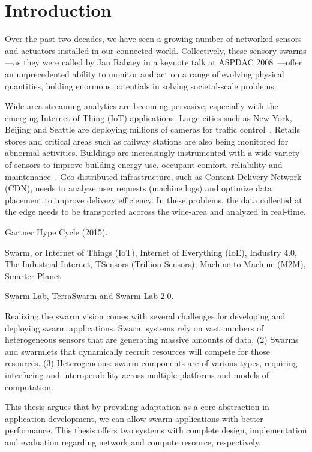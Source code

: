 \documentclass[thesis.tex]{subfiles}
\begin{document}
\chapter{Introduction}

Over the past two decades, we have seen a growing number of networked sensors
and actuators installed in our connected world. Collectively, these sensory
swarms---as they were called by Jan Rabaey in a keynote talk at ASPDAC
2008~\cite{rabaey2008brand}---offer an unprecedented ability to monitor and act
on a range of evolving physical quantities, holding enormous potentials in
solving societal-scale problems.

Wide-area streaming analytics are becoming pervasive, especially with the
emerging Internet-of-Thing (IoT) applications. Large cities such as New York,
Beijing and Seattle are deploying millions of cameras for traffic
control~\cite{london.surveillance,skynet}. Retails stores and critical areas
such as railway stations are also being monitored for abnormal
activities. Buildings are increasingly instrumented with a wide variety of
sensors to improve building energy use, occupant comfort, reliability and
maintenance~\cite{krioukov2012building}. Geo-distributed infrastructure, such as
Content Delivery Network (CDN), needs to analyze user requests (machine logs)
and optimize data placement to improve delivery efficiency. In these problems,
the data collected at the edge needs to be transported acoross the wide-area and
analyzed in real-time.

Gartner Hype Cycle (2015).

Swarm, or Internet of Things (IoT), Internet of Everything (IoE), Industry 4.0,
The Industrial Internet, TSensors (Trillion Sensors), Machine to Machine (M2M),
Smarter Planet.

Swarm Lab, TerraSwarm and Swarm Lab 2.0.

Realizing the swarm vision comes with several challenges for developing and
deploying swarm applications. Swarm systems rely on vast numbers of
heterogeneous sensors that are generating massive amounts of data. (2) Swarms
and swarmlets that dynamically recruit resources will compete for those
resources. (3) Heterogeneous: swarm components are of various types, requiring
interfacing and interoperability across multiple platforms and models of
computation.

This thesis argues that by providing adaptation as a core abstraction in
application development, we can allow swarm applications with better
performance. This thesis offers two systems with complete design, implementation
and evaluation regarding network and compute resource,
respectively.
\end{document}
